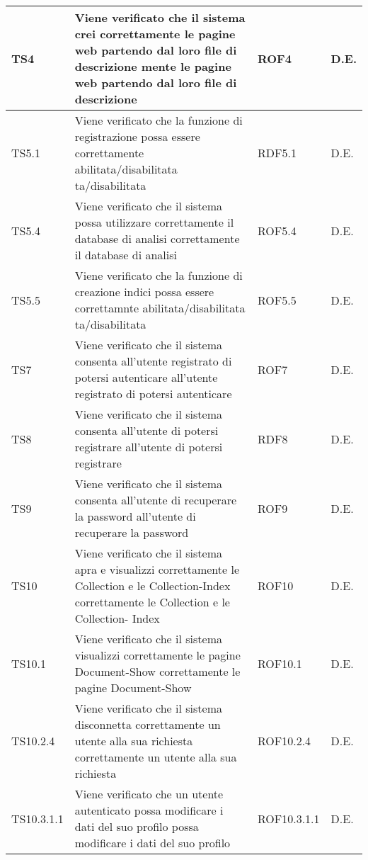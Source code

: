 \begin{center}
\begin{longtable}{|p{2cm}|p{7cm}|p{2cm}|p{2cm}|}
\midrule
TS4
& Viene verificato che il sistema crei correttamente le pagine web partendo dal loro file di descrizione
mente le pagine web partendo dal loro file
di descrizione
& ROF4
& D.E.\\


\midrule
TS5.1
& Viene verificato che la funzione di registrazione possa essere correttamente abilitata/disabilitata
ta/disabilitata
& RDF5.1
& D.E.\\


\midrule
TS5.4
& Viene verificato che il sistema possa utilizzare correttamente il database di analisi
correttamente il database di analisi
& ROF5.4
& D.E.\\


\midrule
TS5.5
& Viene verificato che la funzione di creazione indici possa essere correttamnte abilitata/disabilitata
ta/disabilitata
& ROF5.5
& D.E.\\


\midrule
TS7
& Viene verificato che il sistema consenta all'utente registrato di potersi autenticare
all'utente registrato di potersi autenticare
& ROF7
& D.E.\\


\midrule
TS8
& Viene verificato che il sistema consenta all'utente di potersi registrare
all'utente di potersi registrare
& RDF8
& D.E.\\


\midrule
TS9
& Viene verificato che il sistema consenta all'utente di recuperare la password
all'utente di recuperare la password
& ROF9
& D.E.\\


\midrule
TS10
& Viene verificato che il sistema apra e visualizzi correttamente le Collection e le Collection-Index
correttamente le Collection e le Collection-
Index
& ROF10
& D.E.\\


\midrule
TS10.1
& Viene verificato che il sistema visualizzi correttamente le pagine Document-Show
correttamente le pagine Document-Show
& ROF10.1
& D.E.\\


\midrule
TS10.2.4
& Viene verificato che il sistema disconnetta correttamente un utente alla sua richiesta
correttamente un utente alla sua richiesta
& ROF10.2.4
& D.E.\\


\midrule
TS10.3.1.1
& Viene verificato che un utente autenticato possa modificare i dati del suo profilo
possa modificare i dati del suo profilo
& ROF10.3.1.1
& D.E.\\



\end{longtable}
\end{center}

